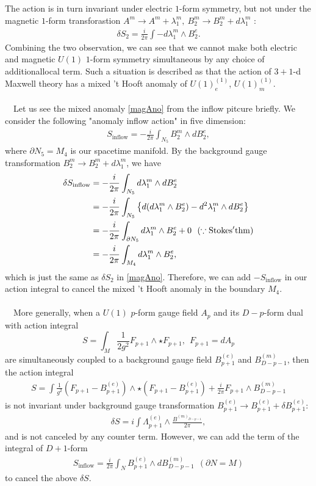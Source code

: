 \documentclass{ltjsarticle}
\theoremstyle{mystyle} %
\numberwithin{equation}{section}
\begin{document}
The action is in turn invariant under electric $1$-form symmetry, 
but not under the magnetic $1$-form transforastion $
A^m\to A^m + \lambda^m_1, ~B^m_2\to B^m_2 + d\lambda^m_1$ : 
\begin{align}
    \delta S_2 = \frac{i}{2\pi}\int -d\lambda^m_1\wedge B^e_2. 
    \label{magAno}
\end{align}
Combining the two observation, we can see that 
we cannot make both electric and magnetic $U(1)$ $1$-form symmetry simultaneous by any choice of additionallocal term. 
Such a situation is described as that the action of $3+1$-d Maxwell theory has a mixed 't Hooft anomaly of $U(1)^{(1)}_e$, $U(1)^{(1)}_m$. \\\\
　Let us see the mixed anomaly \eqref{magAno} from the inflow pitcure briefly. 
We consider the following "anomaly inflow action" in five dimension: 
\begin{align}
    S_{\mathrm{inflow}} = -\frac{i}{2\pi}\int_{N_{5}} B^{m}_2\wedge dB^e_2, 
\end{align}
where $\partial N_5 = M_4$ is our spacetime manifold. By the background gauge transformation $B^m_2 \to B^m_2 + d \lambda^m_1$, we have
\begin{align}
    \delta S_{\mathrm{inflow}} &= -\frac{i}{2\pi}\int_{N_5} d\lambda^m_1 \wedge dB^e_2 \\
    &=-\frac{i}{2\pi}\int_{N_5}\left\{{d(d\lambda^m_1\wedge B^e_2)-d^2\lambda^m_1 \wedge dB^e_2}\right\}\\
    &=-\frac{i}{2\pi}\int_{\partial N_5}d\lambda^m_1\wedge B^e_2 + 0~~
    (\because \mathrm{Stokes' thm})\\
    &=-\frac{i}{2\pi}\int_{M_4}d\lambda^m_1\wedge B^e_2, 
\end{align}
which is just the same as $\delta S_2$ in \eqref{magAno}. 
Therefore, we can add $-S_{\mathrm{inflow}}$ in our action integral to cancel the mixed 't Hooft anomaly 
in the boundary $M_4$. \\\\
　More generally, when a $U(1)$ $p$-form gauge field $A_p$ and its $D-p$-form dual with action integral
$$S=\int_M \frac{1}{2g^2}F_{p+1}\wedge \star F_{p+1}, ~~F_{p+1} = dA_p$$
are simultaneously coupled to a background gauge field $B_{p+1}^{(e)}$ and $B_{D-p-1}^{(m)}$, 
then the action integral
\begin{align}
    S=\int \frac{1}{g^2}(F_{p+1}-B^{(e)}_{p+1})\wedge \star(F_{p+1}-B^{(e)}_{p+1})+\frac{i}{2\pi}F_{p+1}\wedge B^{(m)}_{D-p-1}
\end{align}
is not invariant under background gauge transformation $B^{(e)}_{p+1}\to B^{(e)}_{p+1} + \delta B^{(e)}_{p+1}$: 
\begin{align}
    \delta S = i\int \Lambda^{(e)}_{p+1} \wedge \frac{B^{(m)_{D-p-1}}}{2\pi}, 
\end{align}
and is not canceled by any counter term. 
However, we can add the term of the integral of $D+1$-form
\begin{align}
    S_{\mathrm{inflow}} = \frac{i}{2\pi}\int_{N} B^{(e)}_{p+1}\wedge dB^{(m)}_{D-p-1} ~~(\partial N = M)
\end{align}
to cancel the above $\delta S$. \\
\end{document}
